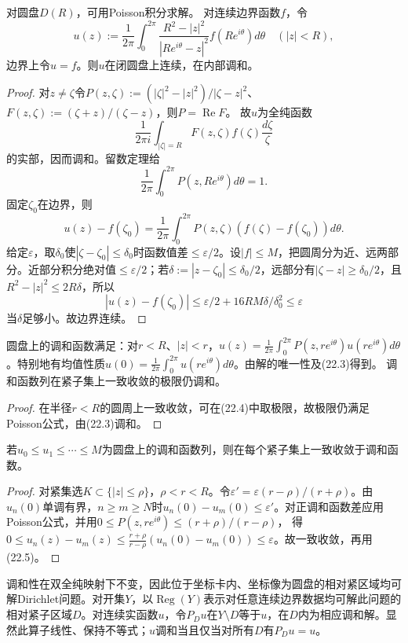 对圆盘$D(R)$，可用Poisson积分求解。
对连续边界函数$f$，令
\begin{equation}u(z):=\frac1{2\pi}\int_0^{2\pi}\frac{R^2-|z|^2}{|Re^{i\theta}-z|^2}f(Re^{i\theta})d\theta\quad(|z|<R),\tag{*}\end{equation}
边界上令$u=f$。则$u$在闭圆盘上连续，在内部调和。
\begin{proof}
对$z\ne\zeta$令$P(z,\zeta):=(|\zeta|^2-|z|^2)/|\zeta-z|^2$、$F(z,\zeta):=(\zeta+z)/(\zeta-z)$，则$P=\operatorname{Re}F$。
故$u$为全纯函数
\[\frac1{2\pi i}\int_{|\zeta|=R}F(z,\zeta)f(\zeta)\frac{d\zeta}{\zeta}\]
的实部，因而调和。留数定理给
\[\frac1{2\pi}\int_0^{2\pi}P(z,Re^{i\theta})d\theta=1.\]
固定$\zeta_0$在边界，则
\[
u(z)-f(\zeta_0)=\frac1{2\pi}\int_0^{2\pi}P(z,\zeta)(f(\zeta)-f(\zeta_0))d\theta.
\]
给定$\varepsilon$，取$\delta_0$使$|\zeta-\zeta_0|\le\delta_0$时函数值差$\le\varepsilon/2$。设$|f|\le M$，把圆周分为近、远两部分。近部分积分绝对值$\le\varepsilon/2$；若$\delta:=|z-\zeta_0|\le\delta_0/2$，远部分有$|\zeta-z|\ge\delta_0/2$，且$R^2-|z|^2\le2R\delta$，所以
\[
|u(z)-f(\zeta_0)|\le\varepsilon/2+16RM\delta/\delta_0^2\le\varepsilon
\]
当$\delta$足够小。故边界连续。
\end{proof}
圆盘上的调和函数满足：对$r<R$、$|z|<r$，$u(z)=\frac1{2\pi}\int_0^{2\pi}P(z,re^{i\theta})u(re^{i\theta})d\theta$。特别地有均值性质$u(0)=\frac1{2\pi}\int_0^{2\pi}u(re^{i\theta})d\theta$。由解的唯一性及(22.3)得到。
调和函数列在紧子集上一致收敛的极限仍调和。
\begin{proof}
在半径$r<R$的圆周上一致收敛，可在(22.4)中取极限，故极限仍满足Poisson公式，由(22.3)调和。
\end{proof}
若$u_0\le u_1\le\cdots\le M$为圆盘上的调和函数列，则在每个紧子集上一致收敛于调和函数。
\begin{proof}
对紧集选$K\subset\{|z|\le\rho\}$，$\rho<r<R$。令$\varepsilon'=\varepsilon(r-\rho)/(r+\rho)$。由$u_n(0)$单调有界，$n\ge m\ge N$时$u_n(0)-u_m(0)\le\varepsilon'$。对正调和函数差应用Poisson公式，并用$0\le P(z,re^{i\theta})\le(r+\rho)/(r-\rho)$，
得$0\le u_n(z)-u_m(z)\le\frac{r+\rho}{r-\rho}(u_n(0)-u_m(0))\le\varepsilon$。故一致收敛，再用(22.5)。
\end{proof}
调和性在双全纯映射下不变，因此位于坐标卡内、坐标像为圆盘的相对紧区域均可解Dirichlet问题。对开集$Y$，以$\operatorname{Reg}(Y)$表示对任意连续边界数据均可解此问题的相对紧子区域$D$。对连续实函数$u$，令$P_Du$在$Y\setminus D$等于$u$，在$D$内为相应调和解。显然此算子线性、保持不等式；$u$调和当且仅当对所有$D$有$P_Du=u$。
